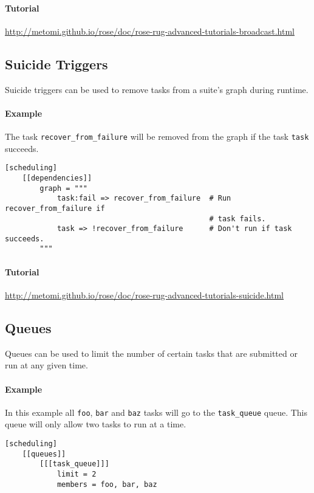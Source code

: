 \paragraph*{Tutorial}
\url{http://metomi.github.io/rose/doc/rose-rug-advanced-tutorials-broadcast.html}


\subsection{Suicide Triggers}

Suicide triggers can be used to remove tasks from a suite's graph during
runtime.

\paragraph*{Example}

The task \lstinline{recover_from_failure} will be removed from the graph if
the task \lstinline{task} succeeds.

\begin{lstlisting}
[scheduling]
    [[dependencies]]
        graph = """
            task:fail => recover_from_failure  # Run recover_from_failure if
                                               # task fails.
            task => !recover_from_failure      # Don't run if task succeeds.
        """
\end{lstlisting}

\paragraph*{Tutorial}
\url{http://metomi.github.io/rose/doc/rose-rug-advanced-tutorials-suicide.html}


\subsection{Queues}

Queues can be used to limit the number of certain tasks that are submitted or
run at any given time.

\paragraph*{Example}

In this example all \lstinline{foo}, \lstinline{bar} and \lstinline{baz} tasks
will go to the \lstinline{task_queue} queue. This queue will only allow two
tasks to run at a time.

\begin{lstlisting}
[scheduling]
    [[queues]]
        [[[task_queue]]]
            limit = 2
            members = foo, bar, baz
\end{lstlisting}

